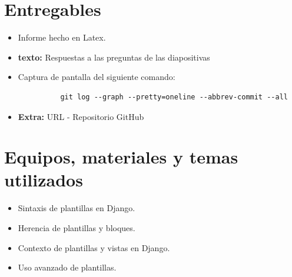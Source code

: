 \documentclass{article}
\begin{document}
 
  \section{Entregables}
    \begin{itemize}
      \item Informe hecho en Latex.
      \item \textbf{texto: }Respuestas a las preguntas de las diapositivas 
      \item Captura de pantalla del siguiente comando:
        \begin{verbatim}
          git log --graph --pretty=oneline --abbrev-commit --all
        \end{verbatim}
      \item \textbf{Extra: }URL - Repositorio GitHub
    \end{itemize}
  
		
	\section{Equipos, materiales y temas utilizados}
    \begin{itemize}
      \item Sintaxis de plantillas en Django.
      \item Herencia de plantillas y bloques.
      \item Contexto de plantillas y vistas en Django.
      \item Uso avanzado de plantillas.
    \end{itemize}

\end{document}
